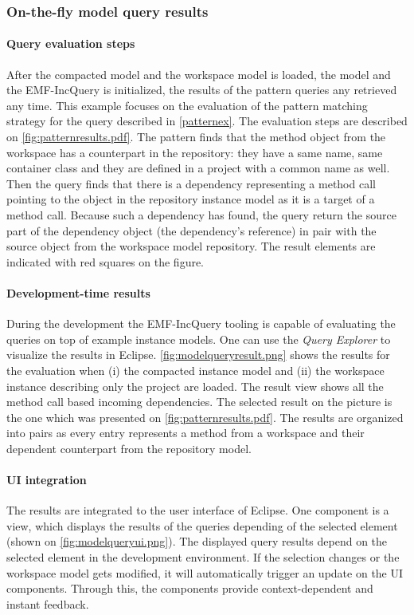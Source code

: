 \subsubsection{On-the-fly model query results}
\paragraph{Query evaluation steps}
After the compacted  model and the workspace model is loaded, the model and the
EMF-IncQuery is initialized, the results of the pattern queries any retrieved
any time. This example focuses on the evaluation of the pattern matching
strategy for the query described in \autoref{patternex}. The evaluation steps 
are described on \autoref{fig:patternresults.pdf}.
The pattern finds that the  method object from the
workspace has a counterpart in the repository: they have a same name, same
container class and they are defined in a project with a common name as well.
Then the query finds that there is a dependency representing a method call
pointing to the  object in the repository instance model as
it is a target of a method call. Because such a dependency has found, the query
return the source part of the dependency object (the dependency's 
reference) in pair with the source object from the workspace model repository.
The result elements are indicated with red squares on the figure.

\paragraph{Development-time results}
During the development the EMF-IncQuery tooling is capable of evaluating the
queries on top of example instance models. One can use the \emph{Query Explorer}
to visualize the results in Eclipse.
\autoref{fig:modelqueryresult.png} shows the results for the evaluation when
 (i) the compacted instance model and  (ii) the workspace instance describing only the
 project are loaded.
The result view shows all the method call based incoming dependencies. The
selected result on the picture is the one which was presented on
\autoref{fig:patternresults.pdf}. The results are organized into pairs as every
entry represents a method from a workspace and their dependent counterpart
from the repository model.

\paragraph{UI integration}
The results are integrated to the user interface of Eclipse. One component is a
view, which displays the results of the queries depending of the selected
element (shown on \autoref{fig:modelqueryui.png}). 
The displayed query results depend on the selected element in the development
environment. If the selection changes or the workspace model gets modified,
it will automatically trigger an update on the UI components. Through this,
the components provide context-dependent and instant feedback.


